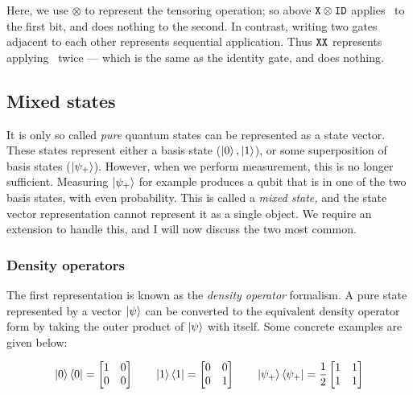 \noindent Here, we use $\otimes$ to represent the tensoring operation; 
so above $\texttt{X} \otimes \texttt{ID}$ applies \X\ to the first bit, and does nothing to the second.
% 
In contrast, writing two gates adjacent to each other represents sequential application. 
% 
Thus $\texttt{X} \texttt{X}$ represents applying \X\ twice --- which is the same as the identity gate, and does nothing.



\subsection{Mixed states}

It is only so called \emph{pure} quantum states can be represented as a state vector. 
% 
These states represent either a basis state ($\ket 0, \ket 1$), or some superposition of basis states ($\ket{\psi _+}$).
% 
However, when we perform measurement, this is no longer sufficient.
% 
Measuring $\ket{\psi _+}$ for example produces a qubit that is in one of the two basis states, with even probability. 
% 
This is called a \emph{mixed state,} and the state vector representation cannot represent it as a single object. 
% 
We require an extension to handle this, and I will now discuss the two most common.


\subsubsection{Density operators}

The first representation is known as the \emph{density operator} formalism. 
% 
A pure state represented by a vector $\ket\psi$ can be converted to the equivalent density operator
form by taking the outer product of $\ket\psi$ with itself.
% 
Some concrete examples are given below:



$$ 
  \ket 0 \bra 0 = \begin{bmatrix}
    1 & 0 \\
    0 & 0
  \end{bmatrix}
\quad\quad
  \ket 1 \bra 1 = \begin{bmatrix}
    0 & 0 \\
    0 & 1
  \end{bmatrix}
\quad\quad
  \ket{\psi_+} \bra{\psi_+} = \frac{1}{2} \begin{bmatrix}
    1 & 1 \\
    1 & 1
  \end{bmatrix}
$$

